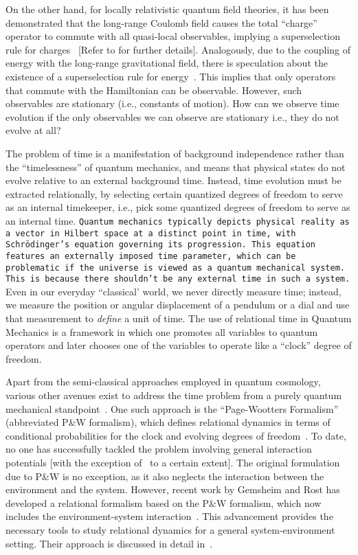 On the other hand, for locally relativistic quantum field theories, it has been demonstrated
that the long-range Coulomb field causes the total ``charge'' operator to commute
with all quasi-local observables, implying a superselection rule for charges~\cite{Strocchi:1974xh} 
[Refer to  for further details].
Analogously, due to the coupling of energy with the long-range gravitational field, 
there is speculation about the existence of a superselection rule for energy~\cite{page1983evolution}.
This implies that only operators that commute
with the Hamiltonian can be observable. However, such observables are stationary
(i.e., constants of motion). How can we observe time evolution if the only observables
we can observe are stationary i.e., they do not evolve at all?

The problem of time is a manifestation of background independence rather than the
``timelessness'' of quantum mechanics, and means that physical states do not evolve
relative to an external background time. Instead, time evolution must be extracted relationally, 
by selecting certain quantized degrees of freedom to serve as an internal timekeeper, 
i.e., pick some quantized degrees of freedom to serve as an internal time. 
\texttt{Quantum mechanics typically depicts physical reality as a vector in Hilbert space at a distinct point in time, 
with Schrödinger's equation governing its progression. This equation features an externally imposed time parameter, 
which can be problematic if the universe is viewed as a quantum mechanical system. This is because there shouldn't be 
any external time in such a system.}
Even in our everyday ``classical' world, we never directly measure time; instead, we measure the
position or angular displacement of a pendulum or a dial and use that measurement to \emph{define} a
unit of time. The use of relational time in Quantum
Mechanics is a framework in which one promotes all variables to quantum operators and
later chooses one of the variables to operate like a ``clock'' degree of freedom.

Apart from the semi-classical approaches employed in quantum cosmology, various other 
avenues exist to address the time problem from a purely quantum mechanical standpoint~\cite{hohn2021trinity}. 
One such approach is the ``Page-Wootters Formalism'' (abbreviated P\&W formalism), 
which defines relational dynamics in terms of conditional probabilities for the clock and 
evolving degrees of freedom~\cite{page1983evolution}. To date, no one has successfully tackled 
the problem involving general interaction potentials [with the exception of~\cite{Smith:2017pwx} 
to a certain extent]. The original formulation due to P\&W is no exception, as it also neglects 
the interaction between the environment and the system. However, recent work by Gemsheim and Rost 
has developed a relational formalism based on the P\&W formalism, which now includes the 
environment-system interaction~\cite{Gemsheim:2023izg}. This advancement provides the necessary 
tools to study relational dynamics for a general system-environment setting. Their approach is 
discussed in detail in~.


